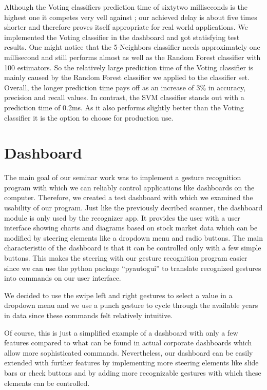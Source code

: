 Although the Voting classifiers prediction time of sixtytwo milliseconds is the highest one it competes very vell against \cite{liu}; our achieved delay is about five times shorter and therefore proves itself appropriate for real world applications. We implemented the Voting classifier in the dashboard and got statisfying test results. One might notice that the 5-Neighbors classifier needs approximately one millisecond and still performs almost as well as the Random Forest classifier with 100 estimators. So the relatively large prediction time of the Voting classifier is mainly caused by the Random Forest classifier we applied to the classifier set. Overall, the longer prediction time pays off as an increase of 3\% in accuracy, precision and recall values. 
In contrast, the SVM classifier stands out with a prediction time of 0.2ms. As it also performs slightly better than the Voting classifier it is the option to choose for production use.


\chapter{Dashboard}
\label{ch:Dashboard}

The main goal of our seminar work was to implement a gesture recognition program with which we can reliably control applications like dashboards on the computer.
Therefore, we created a test dashboard with which we examined the usability of our program.
Just like the previously decribed scanner, the dashboard module is only used by the recognizer app.
It provides the user with a user interface showing charts and diagrams based on stock market data which can be modified by steering elements like a dropdown menu and radio buttons.
The main characteristic of the dashboard is that it can be controlled only with a few simple buttons.
This makes the steering with our gesture recognition program easier since we can use the python package “pyautogui” to translate recognized gestures into commands on our user interface.

We decided to use the swipe left and right gestures to select a value in a dropdown menu and we use a punch gesture to cycle through the available years in data since these commands felt relatively intuitive. 

Of course, this is just a simplified example of a dashboard with only a few features compared to what can be found in actual corporate dashboards which allow more sophisticated commands.
Nevertheless, our dashboard can be easily extended with further features by implementing more steering elements like slide bars or check buttons and by adding more recognizable gestures with which these elements can be controlled.  

